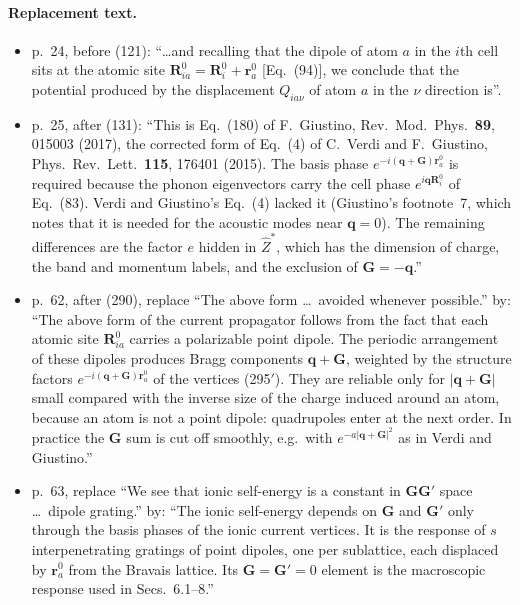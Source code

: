 \paragraph{Replacement text.}
\begin{itemize}
\item p.~24, before (121): ``\dots and recalling that the dipole of atom $a$ in the $i$th cell sits at the atomic site $\mathbf R^0_{ia}=\mathbf R^0_i+\mathbf r^0_a$ [Eq.~(94)], we conclude that the potential produced by the displacement $Q_{ia\nu}$ of atom $a$ in the $\nu$ direction is''.
\item p.~25, after (131): ``This is Eq.~(180) of F.~Giustino, Rev.\ Mod.\ Phys.\ \textbf{89}, 015003 (2017), the corrected form of Eq.~(4) of C.~Verdi and F.~Giustino, Phys.\ Rev.\ Lett.\ \textbf{115}, 176401 (2015). The basis phase $e^{-i(\mathbf q+\mathbf G)\mathbf r^0_a}$ is required because the phonon eigenvectors carry the cell phase $e^{i\mathbf q\mathbf R^0_i}$ of Eq.~(83). Verdi and Giustino's Eq.~(4) lacked it (Giustino's footnote~7, which notes that it is needed for the acoustic modes near $\mathbf q=0$). The remaining differences are the factor $e$ hidden in $\hat Z^*$, which has the dimension of charge, the band and momentum labels, and the exclusion of $\mathbf G=-\mathbf q$.''
\item p.~62, after (290), replace ``The above form \dots\ avoided whenever possible.'' by: ``The above form of the current propagator follows from the fact that each atomic site $\mathbf R^0_{ia}$ carries a polarizable point dipole. The periodic arrangement of these dipoles produces Bragg components $\mathbf q+\mathbf G$, weighted by the structure factors $e^{-i(\mathbf q+\mathbf G)\mathbf r^0_a}$ of the vertices (295$'$). They are reliable only for $|\mathbf q+\mathbf G|$ small compared with the inverse size of the charge induced around an atom, because an atom is not a point dipole: quadrupoles enter at the next order. In practice the $\mathbf G$ sum is cut off smoothly, e.g.\ with $e^{-a|\mathbf q+\mathbf G|^2}$ as in Verdi and Giustino.''
\item p.~63, replace ``We see that ionic self-energy is a constant in $\mathbf G\mathbf G'$ space \dots\ dipole grating.'' by: ``The ionic self-energy depends on $\mathbf G$ and $\mathbf G'$ only through the basis phases of the ionic current vertices. It is the response of $s$ interpenetrating gratings of point dipoles, one per sublattice, each displaced by $\mathbf r^0_a$ from the Bravais lattice. Its $\mathbf G=\mathbf G'=0$ element is the macroscopic response used in Secs.~6.1--8.''

\end{itemize}
